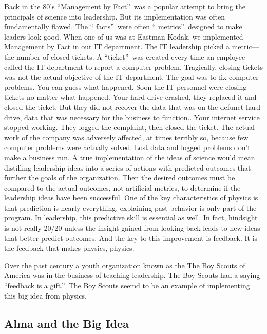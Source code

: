 \documentclass{article}
\begin{document}
Back in the 80's \textquotedblleft Management by Fact\textquotedblright\ was
a popular attempt to bring the principals of science into leadership. But
its implementation was often fundamentally flawed. The \textquotedblleft
facts\textquotedblright\ were often \textquotedblleft
metrics\textquotedblright\ designed to make leaders look good. When one of
us was at Eastman Kodak, we implemented Management by Fact in our IT
department. The IT leadership picked a metric---the number of closed
tickets. A \textquotedblleft ticket\textquotedblright\ was created every
time an employee called the IT department to report a computer problem.
Tragically, closing tickets was not the actual objective of the IT
department. The goal was to fix computer problems. You can guess what
happened. Soon the IT personnel were closing tickets no matter what
happened. Your hard drive crashed, they replaced it and closed the ticket.
But they did not recover the data that was on the defunct hard drive, data
that was necessary for the business to function.. Your internet service
stopped working. They logged the complaint, then closed the ticket. The
actual work of the company was adversely affected, at times terribly so,
because few computer problems were actually solved. Lost data and logged
problems don't make a business run. A true implementation of the ideas of
science would mean distilling leadership ideas into a series of actions with
predicted outcomes that further the goals of the organization. Then the
desired outcomes must be compared to the actual outcomes, not artificial
metrics, to determine if the leadership ideas have been successful. One of
the key characteristics of physics is that prediction is nearly everything,
explaining past behavior is only part of the program. In leadership, this
predictive skill is essential as well. In fact, hindsight is not really
20/20 unless the insight gained from looking back leads to new ideas that
better predict outcomes. And the key to this improvement is feedback. It is
the feedback that makes physics, physics.

Over the past century a youth organization known as the The Boy Scouts of
America was in the business of teaching leadership. The Boy Scouts had a
saying \textquotedblleft feedback is a gift.\textquotedblright\ The Boy
Scouts seemd to be an example of implementing this big idea from physics.

\subsection{Alma and the Big Idea}
\end{document}
